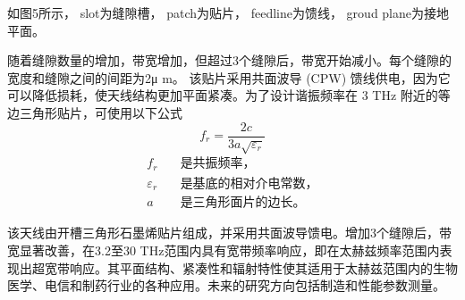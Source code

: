 如图5所示，
slot为缝隙槽，
patch为贴片，
feedline为馈线，
groud plane为接地平面。

随着缝隙数量的增加，带宽增加，但超过3个缝隙后，带宽开始减小。每个缝隙的宽度和缝隙之间的间距为2μ m。
该贴片采用共面波导 (CPW) 馈线供电，因为它可以降低损耗，使天线结构更加平面紧凑。为了设计谐振频率在 3 THz 附近的等边三角形贴片，可使用以下公式
\begin{equation*} f_{r}=\frac{2c}{3a\sqrt{\varepsilon_{r}}} \tag{2} \end{equation*}
\begin{align*}
	f_{r} &\quad \text{是共振频率，} \\
	\varepsilon_{r} &\quad \text{是基底的相对介电常数，} \\
	a &\quad \text{是三角形面片的边长。}
\end{align*}

该天线由开槽三角形石墨烯贴片组成，并采用共面波导馈电。增加3个缝隙后，带宽显著改善，在3.2至30 THz范围内具有宽带频率响应，即在太赫兹频率范围内表现出超宽带响应。其平面结构、紧凑性和辐射特性使其适用于太赫兹范围内的生物医学、电信和制药行业的各种应用。未来的研究方向包括制造和性能参数测量。